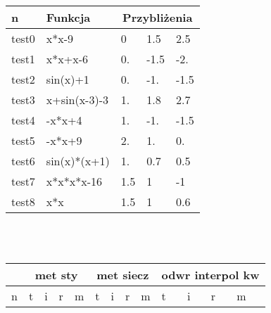 \begin{table}[h]
  \begin{tabular}{| l l | l l l|}
  \hline
  n & Funkcja & \multicolumn{3}{|c|}{Przybliżenia}\\
  \hline 
test0
&
x*x-9
&
0
&
1.5
&
2.5
\\
test1
&
x*x+x-6
&
0.
&
-1.5
&
-2.
\\
test2
&
sin(x)+1
&
0.
&
-1.
&
-1.5
\\
test3
&
x+sin(x-3)-3
&
1.
&
1.8
&
2.7
\\
test4
&
-x*x+4
&
1.
&
-1.
&
-1.5
\\
test5
&
-x*x+9
&
2.
&
1.
&
0.
\\
test6
&
sin(x)*(x+1)
&
1.
&
0.7
&
0.5
\\
test7
&
x*x*x*x-16
&
1.5
&
1
&
-1
\\
test8
&
x*x
&
1.5
&
1
&
0.6
\\
\hline
\end{tabular}\\\\
\begin{tabular}{| l | l l l l| l l l l| l l l l|}
\hline
 & \multicolumn{4}{|c|}{met sty} & \multicolumn{4}{|c}{met siecz} & \multicolumn{4}{|c|}{odwr interpol kw}\\
\hline 
 n &
 t & i & r & m &
 t & i & r & m &
 t & i & r & m \\
\hline


\end{tabular}
\end{table}
